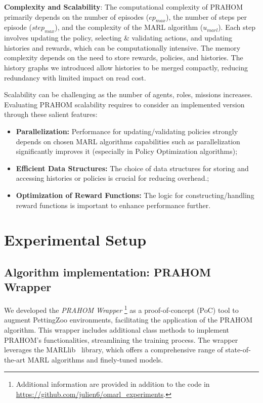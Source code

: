 \documentclass[conference]{IEEEtran}
\begin{document}
\textbf{Complexity and Scalability}: \quad The computational complexity of PRAHOM primarily depends on the number of episodes ($ep_{max}$), the number of steps per episode ($step_{max}$), and the complexity of the MARL algorithm ($u_{marl}$). Each step involves updating the policy, selecting \& validating actions, and updating histories and rewards, which can be computationally intensive. The memory complexity depends on the need to store rewards, policies, and histories. The history graphs we introduced allow histories to be merged compactly, reducing redundancy with limited impact on read cost.

Scalability can be challenging as the number of agents, roles, missions increases. Evaluating PRAHOM scalability requires to consider an implemented version through these salient features:
\begin{itemize}
    \item \textbf{Parallelization:} Performance for updating/validating policies strongly depends on chosen MARL algorithms capabilities such as parallelization significantly improves it (especially in Policy Optimization algorithms);
    \item \textbf{Efficient Data Structures:} The choice of data structures for storing and accessing histories or policies is crucial for reducing overhead.;
    \item \textbf{Optimization of Reward Functions:} The logic for constructing/handling reward functions is important to enhance performance further.
\end{itemize}



\section{Experimental Setup}\label{sec:experimental_setup}

\subsection{Algorithm implementation: PRAHOM Wrapper}

We developed the \textit{PRAHOM Wrapper}
%
\footnote{Additional information are provided in addition to the code in \url{https://github.com/julien6/omarl_experiments}.}
%
as a proof-of-concept (PoC) tool to augment PettingZoo environments, facilitating the application of the PRAHOM algorithm. This wrapper includes additional class methods to implement PRAHOM's functionalities, streamlining the training process. The wrapper leverages the MARLlib~\cite{hu2022marllib} library, which offers a comprehensive range of state-of-the-art MARL algorithms and finely-tuned models.
\end{document}
